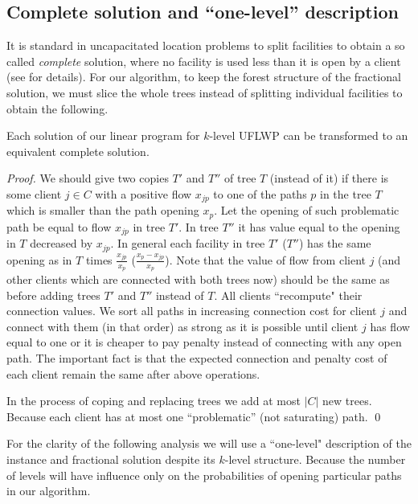 \documentclass{llncs}
\begin{document}
\subsection{Complete solution and ``one-level'' description} \label{sec:one_level}

It is standard in uncapacitated location problems to split facilities to obtain a so called \emph{complete} solution,
where no facility is used less than it is open by a client (see \cite{Sviridenko} for details). For our algorithm, to keep
the forest structure of the fractional solution, we must slice the whole trees instead of splitting individual facilities to obtain the following.

\begin{lemma} \label{completeness}
 Each solution of our linear program for $k$-level UFLWP can be transformed to an equivalent complete solution.
\end{lemma}
\begin{proof}
We should give two copies $T'$ and $ T''$ of tree $T$ (instead of it) if there is some client $j \in C$ with a positive flow $x_{jp}$ to one of the paths $p$ in the tree $T$ which is smaller than the path opening $x_p$. Let the opening of such problematic path be equal to flow $x_{jp}$ in tree $T'$. In tree $T''$ it has value equal to the opening in $T$ decreased by $x_{jp}$. In general each facility in tree $T'$ ($T''$) has the same opening as in $T$ times $\frac{x_{jp}}{x_p}$ ($\frac{x_p - x_{jp}}{x_p}$). Note that the value of flow from client $j$ (and other clients which are connected with both trees now) should be the same as before adding trees $T'$ and $T''$ instead of $T$. All clients ``recompute" their connection values.
We sort all paths in increasing connection cost for client $j$ and connect with them (in that order) as strong as it is possible until client $j$ has flow equal to one or it is cheaper to pay penalty instead of connecting with any open path. The important fact is that the expected connection and penalty cost of each client remain the same after above operations.

In the process of coping and replacing trees we add at most $|C|$ new trees. Because each client has at most one {``problematic''} (not saturating) path.
\qed
\end{proof}

For the clarity of the following analysis we will use a ``one-level" description of the instance and fractional solution despite its $k$-level structure. Because the number of levels will have influence only on the probabilities of opening particular paths in our algorithm.
\end{document}
